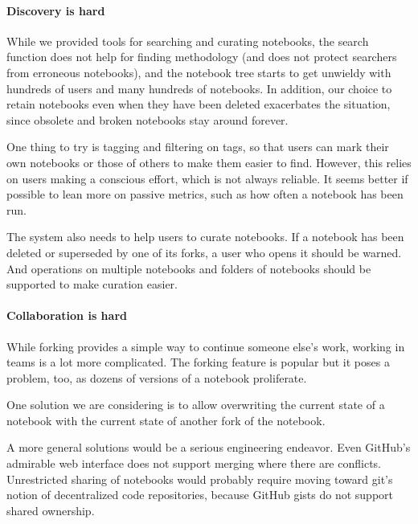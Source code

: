 \paragraph*{Discovery is hard}
While we provided tools for searching and curating notebooks, the
search function does not help for finding methodology (and does not protect
searchers from erroneous notebooks), and the notebook tree starts to get
unwieldy with hundreds of users and many hundreds of notebooks. In addition,
our choice to retain notebooks even when they have been deleted 
exacerbates the situation, since obsolete and broken notebooks stay around
forever.

One thing to try is tagging and filtering on tags, so that users
can mark their own notebooks or those of others to make them easier to
find. However, this relies on users making a conscious effort, which
is not always reliable. It seems better if possible to lean more on
passive metrics, such as how often a notebook has been run.

The system also needs to help users to curate notebooks. If a notebook
has been deleted or superseded by one of its forks, a user who opens it
should be warned. And operations on multiple notebooks and folders of
notebooks should be supported to make curation easier.

\paragraph*{Collaboration is hard}
While forking provides a simple way to continue someone else's work, working
in teams is a lot more complicated. The forking feature is popular but it
poses a problem, too, as dozens of versions of a notebook proliferate.

One solution we are considering is to allow overwriting the current state
of a notebook with the current state of another fork of the notebook.

A more general solutions would be a serious engineering endeavor. Even
GitHub's admirable web interface does not support merging where there are
conflicts. Unrestricted sharing of notebooks would probably require moving
toward git's notion of decentralized code repositories, because GitHub gists
do not support shared ownership.
